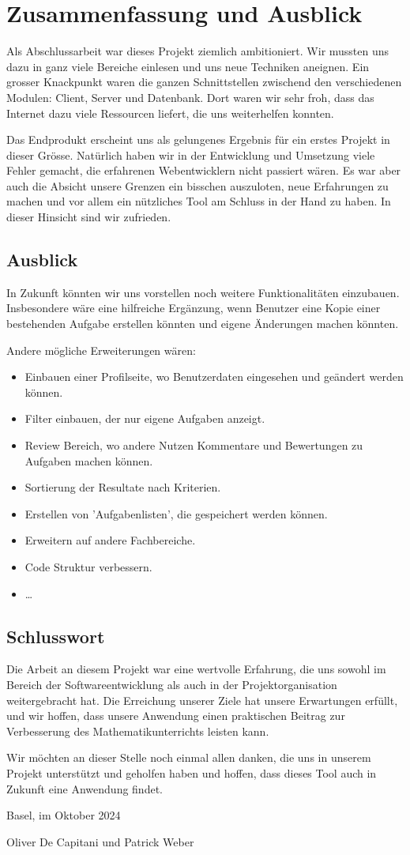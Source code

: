 \section{Zusammenfassung und Ausblick}
Als Abschlussarbeit war dieses Projekt ziemlich ambitioniert. Wir mussten uns dazu in ganz viele Bereiche einlesen und uns neue Techniken aneignen. Ein grosser Knackpunkt waren die ganzen Schnittstellen zwischend den verschiedenen Modulen: Client, Server und Datenbank. Dort waren wir sehr froh, dass das Internet dazu viele Ressourcen liefert, die uns weiterhelfen konnten. 

Das Endprodukt erscheint uns als gelungenes Ergebnis für ein erstes Projekt in dieser Grösse. Natürlich haben wir in der Entwicklung und Umsetzung viele Fehler gemacht, die erfahrenen Webentwicklern nicht passiert wären. Es war aber auch die Absicht unsere Grenzen ein bisschen auszuloten, neue Erfahrungen zu machen und vor allem ein nützliches Tool am Schluss in der Hand zu haben. In dieser Hinsicht sind wir zufrieden.


\subsection{Ausblick}
In Zukunft könnten wir uns vorstellen noch weitere Funktionalitäten einzubauen. Insbesondere wäre eine hilfreiche Ergänzung, wenn Benutzer eine Kopie einer bestehenden Aufgabe erstellen könnten und eigene Änderungen machen könnten.

Andere mögliche Erweiterungen wären:
\begin{itemize}
    \item Einbauen einer Profilseite, wo Benutzerdaten eingesehen und geändert werden können. 
    \item Filter einbauen, der nur eigene Aufgaben anzeigt.
    \item Review Bereich, wo andere Nutzen Kommentare und Bewertungen zu Aufgaben machen können.
    \item Sortierung der Resultate nach Kriterien.
    \item Erstellen von 'Aufgabenlisten', die gespeichert werden können.
    \item Erweitern auf andere Fachbereiche.
    \item Code Struktur verbessern.
    \item \ldots
\end{itemize}


\subsection{Schlusswort}
Die Arbeit an diesem Projekt war eine wertvolle Erfahrung, die uns sowohl im Bereich der Softwareentwicklung als auch in der Projektorganisation weitergebracht hat. Die Erreichung unserer Ziele hat unsere Erwartungen erfüllt, und wir hoffen, dass unsere Anwendung einen praktischen Beitrag zur Verbesserung des Mathematikunterrichts leisten kann.

Wir möchten an dieser Stelle noch einmal allen danken, die uns in unserem Projekt unterstützt und geholfen haben und hoffen, dass dieses Tool auch in Zukunft eine Anwendung findet.


\begin{flushright}
    Basel, im Oktober 2024
    
    Oliver De Capitani und Patrick Weber
\end{flushright}